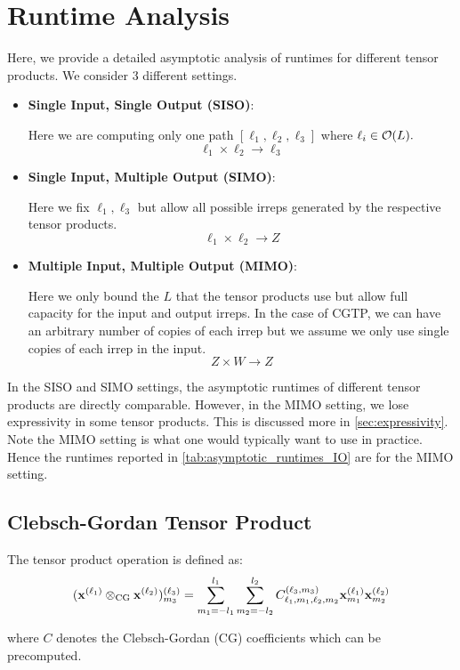 \section{Runtime Analysis}
\label{sec:runtimes}

Here, we provide a detailed asymptotic analysis of runtimes for different tensor products. We consider 3 different settings.
\begin{itemize}
    \item 
    \textbf{Single Input, Single Output (SISO)}:
    
    Here we are computing only one path $[\ell_1,\ell_2,\ell_3]$ where $\ell_i\in\mathcal{O}(L).$
    \[\ell_1\times\ell_2\to\ell_3\] 
    \item \textbf{Single Input, Multiple Output (SIMO)}:
    
    Here we fix $\ell_1,\ell_3$ but allow all possible irreps generated by the respective tensor products.
    \[\ell_1 \times \ell_2 \to Z\]
    \item \textbf{Multiple Input, Multiple Output (MIMO)}: 
    
    Here we only bound the $L$ that the tensor products use but allow full capacity for the input and output irreps. In the case of CGTP, we can have an arbitrary number of copies of each irrep but we assume we only use single copies of each irrep in the input.
    \[Z\times W\to Z\]
\end{itemize}
In the SISO and SIMO settings, the asymptotic runtimes of different tensor products are directly comparable. However, in the MIMO setting, we lose expressivity in some tensor products. This is discussed more in \autoref{sec:expressivity}. Note the MIMO setting is what one would typically want to use in practice. Hence the runtimes reported in \autoref{tab:asymptotic_runtimes_IO} are for the MIMO setting.

\subsection{Clebsch-Gordan Tensor Product}
\label{sec:CGTP_runtime}
The tensor product operation is defined as:
\begin{align}
\label{eqn:tp} (\mathbf{x}^{(\ell_{1})} \otimes_{\mathrm{CG}} \mathbf{x}^{(\ell_{2})})^{(\ell_3)}_{m_3} =\sum_{m_1=-l_1}^{l_1}\sum_{m_2=-l_2}^{l_2}
C^{(\ell_3,m_3)}_{\ell_1,m_1,\ell_2,m_2}\mathbf{x}^{(\ell_{1})}_{m_1}\mathbf{x}^{(\ell_{2})}_{m_2}
\end{align}


where $C$ denotes the Clebsch-Gordan (CG) coefficients which can be precomputed.

